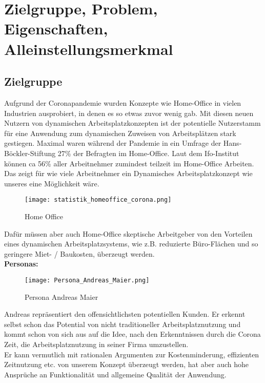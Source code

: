 \chapter{Zielgruppe, Problem, Eigenschaften, Alleinstellungsmerkmal}

\section{Zielgruppe}

Aufgrund der Coronapandemie wurden Konzepte wie Home-Office in vielen Industrien ausprobiert, in denen es so etwas zuvor wenig gab.
Mit diesen neuen Nutzern von dynamischen Arbeitsplatzkonzepten ist der potentielle Nutzerstamm für eine Anwendung zum dynamischen Zuweisen von Arbeitsplätzen stark gestiegen.
Maximal waren während der Pandemie in ein Umfrage der Hans-Böckler-Stiftung 27\% der Befragten im Home-Office.
Laut dem Ifo-Institut können ca 56\% aller Arbeitnehmer zumindest teilzeit im Home-Office Arbeiten. 
Das zeigt für wie viele Arbeitnehmer ein Dynamisches Arbeitsplatzkonzept wie unseres eine Möglichkeit wäre.

\begin{figure}[!h]
    \centering
    \texttt{[image: statistik\_homeoffice\_corona.png]}
    \caption{Home Office}
    \label{fig:HomeOffice}
\end{figure}

Dafür müssen aber auch Home-Office skeptische Arbeitgeber von den Vorteilen eines dynamischen Arbeitsplatzsystems, wie z.B. reduzierte Büro-Flächen und so geringere Miet- / Baukosten, überzeugt werden.
\pagebreak
\\
\textbf{Personas: }

\begin{figure}[!h]
    \centering
    \texttt{[image: Persona\_Andreas\_Maier.png]}
    \caption{Persona Andreas Maier}
    \label{fig:PersonaAndreasMaier}
\end{figure}

Andreas repräsentiert den offensichtlichsten potentiellen Kunden.
Er erkennt selbst schon das Potential von nicht traditioneller Arbeitsplatznutzung und kommt schon von sich aus auf die Idee, nach den Erkenntnissen durch die Corona Zeit, die Arbeitsplatznutzung in seiner Firma umzustellen.\\
Er kann vermutlich mit rationalen Argumenten zur Kostenminderung, effizienten Zeitnutzung etc. von unserem Konzept überzeugt werden, hat aber auch hohe Ansprüche an Funktionalität und allgemeine Qualität der Anwendung.

